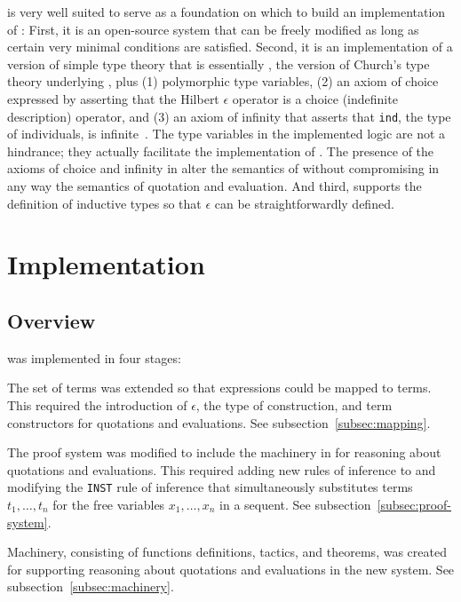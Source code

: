 \documentclass[fleqn]{llncs}
\begin{document}
\HL{} is very well suited to serve as a foundation on which to build
an implementation of {\churchqe}: First, it is an open-source system
that can be freely modified as long as certain very minimal conditions
are satisfied.  Second, it is an implementation of a version of simple
type theory that is essentially {\qzero}, the version of Church's type
theory underlying {\churchqe}, plus (1) polymorphic type variables,
(2) an axiom of choice expressed by asserting that the Hilbert
$\epsilon$ operator is a choice (indefinite description) operator, and
(3) an axiom of infinity that asserts that \texttt{ind}, the type of
individuals, is infinite~\cite{Harrison09}.  The type variables in the
implemented logic are not a hindrance; they actually facilitate the
implementation of {\churchqe}.  The presence of the axioms of choice
and infinity in {\HL} alter the semantics of {\churchqe} without
compromising in any way the semantics of quotation and evaluation.
And third, \HL{} supports the definition of inductive types so that
$\epsilon$ can be straightforwardly defined.

\section{Implementation}\label{sec:implementation}

\subsection{Overview}

{\HLQE} was implemented in four stages:

\be

  \item The set of {\HL} terms was extended so that {\churchqe}
    expressions could be mapped to {\HL} terms.  This required the
    introduction of $\epsilon$, the type of construction, and term
    constructors for quotations and evaluations.  See
    subsection~\ref{subsec:mapping}.

  \item The {\HL} proof system was modified to include the machinery
    in {\churchqe} for reasoning about quotations and evaluations.
    This required adding new rules of inference to {\HL} and modifying
    the {\HL} \texttt{INST} rule of inference that simultaneously
    substitutes terms $t_1,\ldots,t_n$ for the free variables
    $x_1,\ldots,x_n$ in a sequent.  See
    subsection~\ref{subsec:proof-system}.

  \item Machinery, consisting of {\HOL} functions definitions,
    tactics, and theorems, was created for supporting reasoning about
    quotations and evaluations in the new system.  See
    subsection~\ref{subsec:machinery}.
\end{document}
